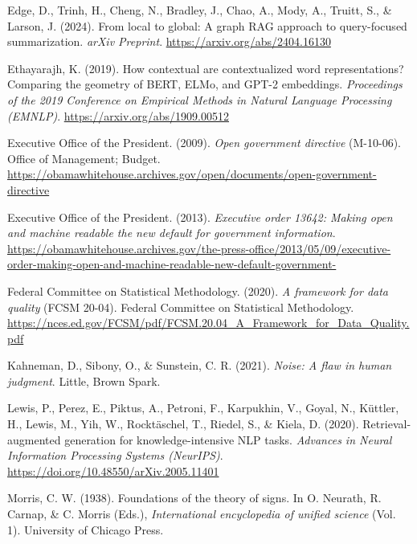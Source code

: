 \documentclass[
  11pt,
  letterpaper,
]{article}
\newlength{\cslhangindent}
\newenvironment{CSLReferences}[2] %
 {\begin{list}{}{%
  \setlength{\itemindent}{0pt}
  \setlength{\leftmargin}{0pt}
  \setlength{\parsep}{0pt}
  \ifodd #1
   \setlength{\leftmargin}{\cslhangindent}
   \setlength{\itemindent}{-1\cslhangindent}
  \fi
  \setlength{\itemsep}{#2\baselineskip}}}
 {\end{list}}
\begin{document}
\label{refs}
\begin{CSLReferences}{1}{0}
Edge, D., Trinh, H., Cheng, N., Bradley, J., Chao, A., Mody, A., Truitt,
S., \& Larson, J. (2024). From local to global: A graph {RAG} approach
to query-focused summarization. \emph{arXiv Preprint}.
\url{https://arxiv.org/abs/2404.16130}

Ethayarajh, K. (2019). How contextual are contextualized word
representations? {Comparing} the geometry of {BERT}, {ELMo}, and {GPT-2}
embeddings. \emph{Proceedings of the 2019 Conference on Empirical
Methods in Natural Language Processing (EMNLP)}.
\url{https://arxiv.org/abs/1909.00512}

Executive Office of the President. (2009). \emph{Open government
directive} (M-10-06). Office of Management; Budget.
\url{https://obamawhitehouse.archives.gov/open/documents/open-government-directive}

Executive Office of the President. (2013). \emph{Executive order 13642:
Making open and machine readable the new default for government
information}.
\url{https://obamawhitehouse.archives.gov/the-press-office/2013/05/09/executive-order-making-open-and-machine-readable-new-default-government-}

Federal Committee on Statistical Methodology. (2020). \emph{A framework
for data quality} (FCSM 20-04). Federal Committee on Statistical
Methodology.
\url{https://nces.ed.gov/FCSM/pdf/FCSM.20.04_A_Framework_for_Data_Quality.pdf}

Kahneman, D., Sibony, O., \& Sunstein, C. R. (2021). \emph{Noise: A flaw
in human judgment}. Little, Brown Spark.

Lewis, P., Perez, E., Piktus, A., Petroni, F., Karpukhin, V., Goyal, N.,
Küttler, H., Lewis, M., Yih, W., Rocktäschel, T., Riedel, S., \& Kiela,
D. (2020). Retrieval-augmented generation for knowledge-intensive {NLP}
tasks. \emph{Advances in Neural Information Processing Systems
(NeurIPS)}. \url{https://doi.org/10.48550/arXiv.2005.11401}

Morris, C. W. (1938). Foundations of the theory of signs. In O. Neurath,
R. Carnap, \& C. Morris (Eds.), \emph{International encyclopedia of
unified science} (Vol. 1). University of Chicago Press.


\end{CSLReferences}
\end{document}
